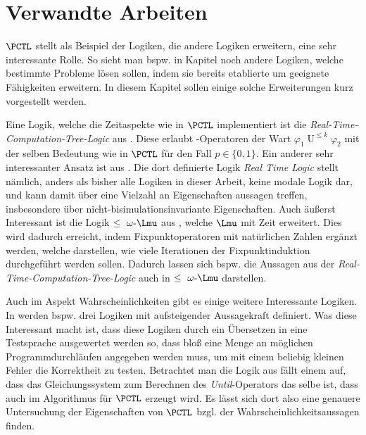 \section{Verwandte Arbeiten}

$\PCTL$ stellt als Beispiel der Logiken, die andere Logiken erweitern, eine sehr interessante Rolle.
So sieht man bspw. in Kapitel noch andere Logiken, welche bestimmte Probleme lösen sollen, indem sie bereits etablierte um geeignete Fähigkeiten erweitern.
In diesem Kapitel sollen einige solche Erweiterungen kurz vorgestellt werden.

Eine Logik, welche die Zeitaspekte wie in $\PCTL$ implementiert ist die \textit{Real-Time-Computation-Tree-Logic} aus \cite{emerson1991quantitative}. 
Diese erlaubt -Operatoren der Wart $\varphi_1 \operatorname{U}^{\leq k} \varphi_2$ mit der selben Bedeutung wie in $\PCTL$ für den Fall $p\in \{0,1\}$.
Ein anderer sehr interessanter Ansatz ist aus \cite{jahanian1986safety}.
Die dort definierte Logik \textit{Real Time Logic} stellt nämlich, anders als bisher alle Logiken in dieser Arbeit, keine modale Logik dar, und kann damit über eine Vielzahl an Eigenschaften aussagen treffen, insbesondere über nicht-bisimulationsinvariante Eigenschaften.
Auch äußerst Interessant ist die Logik $\leq\text{ }\omega\text{-}\Lmu$ aus \cite{emerson1991real}, welche $\Lmu$ mit Zeit erweitert.
Dies wird dadurch erreicht, indem Fixpunktoperatoren mit natürlichen Zahlen ergänzt werden, welche darstellen, wie viele Iterationen der Fixpunktinduktion durchgeführt werden sollen.
Dadurch lassen sich bspw. die Aussagen aus der \textit{Real-Time-Computation-Tree-Logic} auch in $\leq\text{ }\omega\text{-}\Lmu$ darstellen.

Auch im Aspekt Wahrscheinlichkeiten gibt es einige weitere Interessante Logiken. 
In \cite{larsen1989bisimulation} werden bspw. drei Logiken mit aufsteigender Aussagekraft definiert.
Was diese Interessant macht ist, dass diese Logiken durch ein Übersetzen in eine \glqq Testsprache\grqq{} ausgewertet werden so, dass bloß eine Menge an möglichen Programmdurchläufen angegeben werden muss, um mit einem beliebig kleinen Fehler die Korrektheit zu testen.
Betrachtet man die Logik aus \cite{courcoubetis1995complexity} fällt einem auf, dass das Gleichungssystem zum Berechnen des \textit{Until}-Operators das selbe ist, dass auch im Algorithmus für $\PCTL$ erzeugt wird.
Es lässt sich dort also eine genauere Untersuchung der Eigenschaften von $\PCTL$ bzgl. der Wahrscheinlichkeitsaussagen finden.

